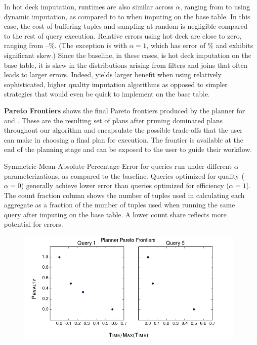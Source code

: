 {In hot deck imputation, runtimes are also similar across $\alpha$, ranging from
\runtimehotdecklow{} to \runtimehotdeckhigh{} using dynamic imputation, as compared to
\runtimehotdecklowbase{} to \runtimehotdeckhighbase{} when imputing on the base table. In
this case, the cost of buffering tuples and sampling at random is negligible compared to the
rest of query execution. Relative errors using hot deck are close to zero, ranging from
\smapehotdecklow{}--\smapehotdeckhigh{}\%. (The exception is  with $\alpha=1$, which has error
of \smapehotdeckhighoutlier{}\% and exhibits significant skew.) Since the baseline, in these
cases, is hot deck imputation on the base table, it is skew in the distributions arising from
filters and joins that often leads to larger errors. Indeed, \ProjectName{} yields
larger benefit when using relatively sophisticated, higher quality imputation algorithms as
opposed to simpler strategies that would even be quick to implement on the base table.

\textbf{Pareto Frontiers}\quad
{} shows the final Pareto frontiers produced by the planner for  and . These are the resulting set of plans after pruning dominated plans throughout our algorithm
and encapsulate the possible trade-offs that the user can make in choosing a final plan for execution. The frontier is available at the end of the planning stage and
can be exposed to the user to guide their workflow.

\begin{table}
\centering

\caption{Symmetric-Mean-Absolute-Percentage-Error for queries run under different $\alpha$ parameterizations, as compared to the baseline.
Queries optimized
    for quality ($\alpha=0$) generally achieve lower error than queries optimized for
    efficiency ($\alpha=1$). The count fraction column shows the number of tuples used in calculating each aggregate
     as a fraction of the number of tuples used when running the same query after imputing on the base table.
    A lower count share reflects more potential for errors.}
\label{table:smape}
\end{table}

\begin{figure}
\centering
\includegraphics[scale=0.4]{figures/pareto_frontiers_plot.png}
\caption{
\label{fig:pareto-frontiers}
}
\end{figure}

}
